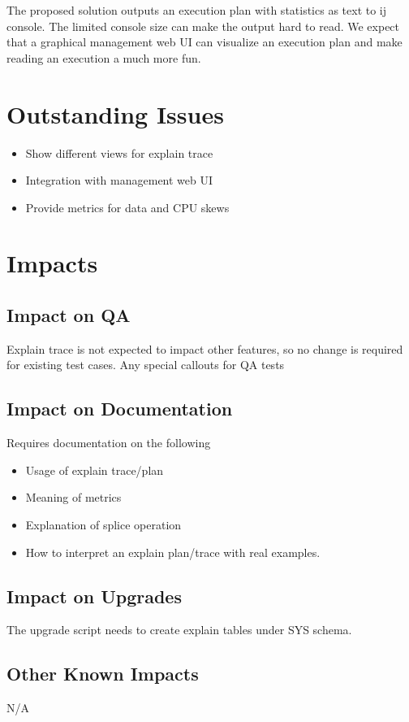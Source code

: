 \documentclass{article}
\begin{document}
\noindent
The proposed solution outputs an execution plan with statistics as text to ij console. The limited console size can make the output hard to read. We expect that a graphical management web UI can visualize an execution plan and make reading an execution a much more fun.


\section{Outstanding Issues}

\begin{itemize}
  \item Show different views for explain trace
  \item Integration with management web UI
  \item Provide metrics for data and CPU skews
\end{itemize}

\section{Impacts}

\subsection{Impact on QA}
Explain trace is not expected to impact other features, so no change is required for existing test cases. 
Any special callouts for QA tests

\subsection{Impact on Documentation} 
Requires documentation on the following
\begin{itemize}
  \item Usage of explain trace/plan
  \item Meaning of metrics
  \item Explanation of splice operation
  \item How to interpret an explain plan/trace with real examples.
\end{itemize}

\subsection{Impact on Upgrades}

The upgrade script needs to create explain tables under SYS schema.

\subsection{Other Known Impacts}

N/A
\end{document}
